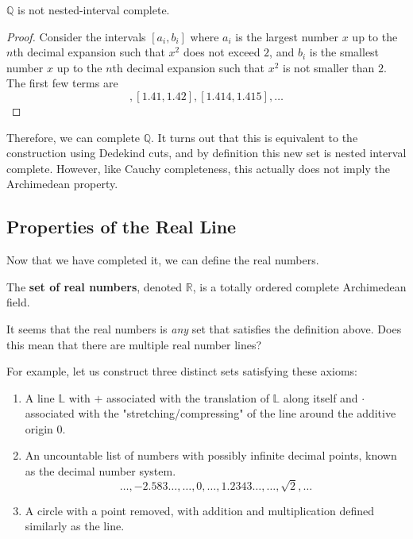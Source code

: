   \begin{theorem}
    $\mathbb{Q}$ is not nested-interval complete. 
  \end{theorem}
  \begin{proof}
    Consider the intervals $[a_i, b_i]$ where $a_i$ is the largest number $x$ up to the $n$th decimal expansion such that $x^2$ does not exceed $2$, and $b_i$ is the smallest number $x$ up to the $n$th decimal expansion such that $x^2$ is not smaller than $2$. The first few terms are 
    \begin{equation}
      [1.4, 1.5], [1.41, 1.42], [1.414, 1.415], \ldots
    \end{equation}
  \end{proof}

  Therefore, we can complete $\mathbb{Q}$. It turns out that this is equivalent to the construction using Dedekind cuts, and by definition this new set is nested interval complete. However, like Cauchy completeness, this actually does not imply the Archimedean property. 

\subsection{Properties of the Real Line} 

  Now that we have completed it, we can define the real numbers. 

  \begin{definition}
    The \textbf{set of real numbers}, denoted $\mathbb{R}$, is a totally ordered complete Archimedean field. 
  \end{definition} 

  It seems that the real numbers is \textit{any} set that satisfies the definition above. Does this mean that there are multiple real number lines? 

  \begin{example}
    For example, let us construct three distinct sets satisfying these axioms: 
    \begin{enumerate}
      \item A line $\mathbb{L}$ with $+$ associated with the translation of $\mathbb{L}$ along itself and $\cdot$ associated with the "stretching/compressing" of the line around the additive origin $0$. 
      \item An uncountable list of numbers with possibly infinite decimal points, known as the decimal number system. 
      \begin{equation}
        \ldots, -2.583\ldots, \ldots , 0, \ldots, 1.2343\ldots, \ldots, \sqrt{2}, \ldots
      \end{equation}
      \item A circle with a point removed, with addition and multiplication defined similarly as the line. 
    \end{enumerate}
  \end{example}

